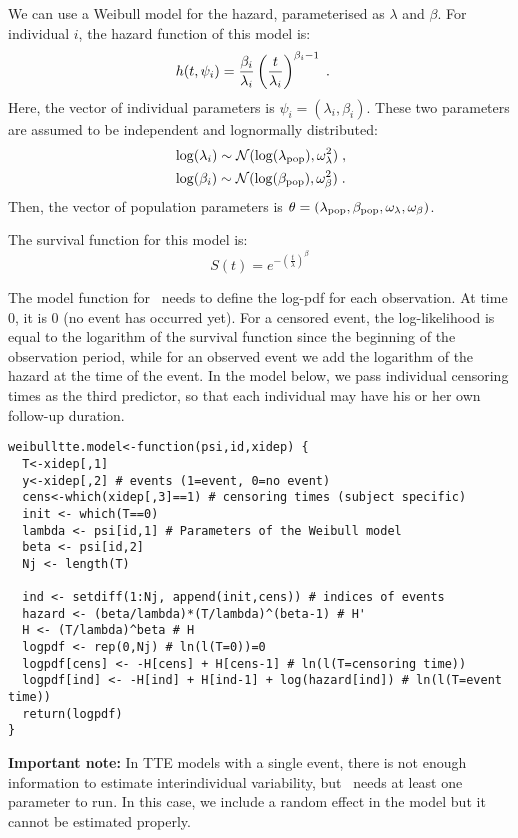 We can use a Weibull model for the hazard, parameterised as $\lambda$ and $\beta$. For individual $i$, the hazard function of this model is:
\begin{align}\label{weibullmodel}
& h(t, \psi_i) = \frac{\beta_i}{\lambda_i}\left(\frac{t}{\lambda_i}\right)^{\beta_i-1}\;.
\end{align}
Here, the vector of individual parameters is $\psi_i = (\lambda_i, \beta_i)$. These two parameters are assumed to be independent and  lognormally distributed:
\begin{align} \label{indivtte}
& \log(\lambda_i) \sim \mathcal{N}(\log(\lambda_{\rm pop}), \omega^2_{\lambda})\;,\\
& \log(\beta_i) \sim \mathcal{N}(\log(\beta_{\rm pop}), \omega^2_{\beta})\;.
\end{align}
Then, the vector of population parameters is $\theta = (\lambda_{\rm pop}, \beta_{\rm pop}, \omega_{\lambda}, \omega_{\beta})$.

The survival function for this model is:
$$ S(t) = e^{ - \left( \frac{t}{\lambda} \right) ^{\beta}}$$

The model function for \monolix~needs to define the log-pdf for each observation. At time 0, it is 0 (no event has occurred yet). For a censored event, the log-likelihood is equal to the logarithm of the survival function since the beginning of the observation period, while for an observed event we add the logarithm of the hazard at the time of the event. In the model below, we pass individual censoring times as the third predictor, so that each individual may have his or her own follow-up duration.

\begin{verbatim}
weibulltte.model<-function(psi,id,xidep) {
  T<-xidep[,1]
  y<-xidep[,2] # events (1=event, 0=no event)
  cens<-which(xidep[,3]==1) # censoring times (subject specific)
  init <- which(T==0)
  lambda <- psi[id,1] # Parameters of the Weibull model
  beta <- psi[id,2]
  Nj <- length(T)
  
  ind <- setdiff(1:Nj, append(init,cens)) # indices of events
  hazard <- (beta/lambda)*(T/lambda)^(beta-1) # H'
  H <- (T/lambda)^beta # H
  logpdf <- rep(0,Nj) # ln(l(T=0))=0
  logpdf[cens] <- -H[cens] + H[cens-1] # ln(l(T=censoring time))
  logpdf[ind] <- -H[ind] + H[ind-1] + log(hazard[ind]) # ln(l(T=event time))
  return(logpdf)
}
\end{verbatim}


{\bf Important note:} In TTE models with a single event, there is not enough information to estimate interindividual variability, but \monolix~needs at least one parameter to run. In this case, we include a random effect in the model but it cannot be estimated properly.



